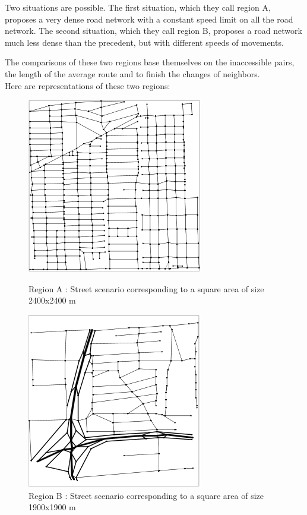 Two situations are possible.
The first situation, which they call region A, proposes a very dense road network with a constant speed limit on all the road network. The second situation, which they call region B, proposes a road network much less dense than the precedent, but with different speeds of movements.

The comparisons of these two regions base themselves on the inaccessible pairs, the length of the average route and to finish the changes of neighbors.\\

Here are representations of these two regions:
\begin{figure}[h!]
    \begin{minipage}[b]{0.4\linewidth}
        \centering \includegraphics[scale=1]{../images/cityA.png}
        \caption{Region A : Street scenario corresponding to a square area of size 2400x2400 m\cite{VehicularAdHocNetworks9}}
    \end{minipage}\hfill
    \begin{minipage}[b]{0.48\linewidth}
        \centering \includegraphics[scale=1]{../images/cityB.png}
        \caption{Region B : Street scenario corresponding to a square area of size 1900x1900 m\cite{VehicularAdHocNetworks9}}
    \end{minipage}
\end{figure}

